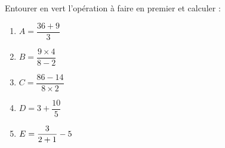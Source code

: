 
\begin{exercice}\label{exosmath-0732}

    Entourer en vert l'opération à faire en premier et calculer :
    \begin{multicols}{2}
        \begin{enumerate}
            \item
                \( A=\dfrac{ 36+9 }{ 3 }\) 
            \item
                \( B=\dfrac{ 9\times 4 }{ 8-2 }\)
            \item
                \( C=\dfrac{ 86-14 }{ 8\times 2 }\)
            \item
                \( D=3+\dfrac{ 10 }{ 5 }\)
            \item
                \( E=\dfrac{ 3\time 6 }{ 2+1 }-5\)
        \end{enumerate}
    \end{multicols}

\end{exercice}
